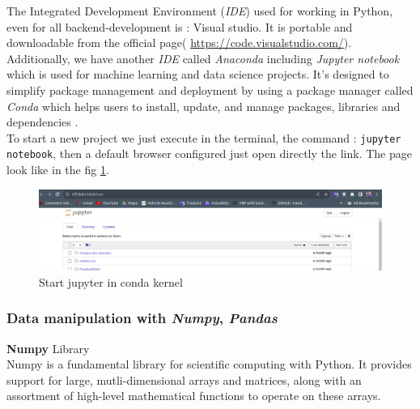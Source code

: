 \documentclass[12pt,a4paper, oneside]{book}
\begin{document}
The Integrated Development Environment (\textit{IDE}) used for working in Python, even for all backend-development is : Visual studio. It is portable and downloadable from the official page( \url{https://code.visualstudio.com/}). Additionally, we have another \textit{IDE} called \textit{Anaconda} including \textit{Jupyter notebook} which is used for machine learning and data science projects. It's designed to simplify package management and deployment by using a package manager called \textit{Conda} which helps users to install, update, and manage packages, libraries and dependencies \cite{teimourzadeh2022application}.\\

To start a new project we just execute in the terminal, the command :  \texttt{jupyter notebook}, then a default browser configured just open directly the link. The page look like in the fig \ref{fig:jupyteropen}.
\begin{figure}
	\centering
	\includegraphics[width=1\linewidth]{jupyterOpen}
	\caption{Start jupyter in conda kernel}
	\label{fig:jupyteropen}
\end{figure}  

\subsubsection{{\large Data manipulation with \textit{Numpy}, \textit{Pandas}}}
  {\textbf{Numpy}} Library\\
 
   Numpy is a fundamental library for scientific computing with Python. It provides support for large, mutli-dimensional arrays and matrices, along with an assortment of high-level mathematical functions to operate on these arrays.\\
   
\end{document}
